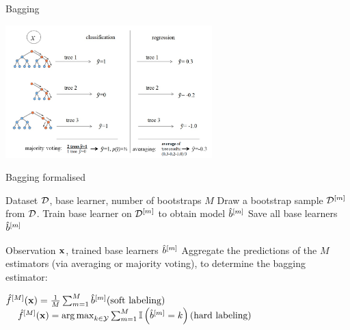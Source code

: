 \documentclass[11pt,compress,t,notes=noshow, xcolor=table]{beamer}
\begin{document}
\begin{vbframe}{Bagging}
\begin{center}
\includegraphics[width=0.6\textwidth]{figure_man/rf_majvot_averaging.png}
\end{center}
\end{vbframe}


\begin{vbframe}{Bagging formalised}

\begin{algorithm}[H]
  \footnotesize
  \caption*{Bagging algorithm: Training}
  \begin{algorithmic}[1]
     Dataset $\mathcal{D}$, base learner, number of bootstraps $M$
      \State Draw a bootstrap sample $\mathcal{D}^{[m]}$ from $\mathcal{D}$.
      \State Train base learner on $\mathcal{D}^{[m]}$ to obtain model $\hat{b}^{[m]}$
    \EndFor
    \State Save all base learners $\hat{b}^{[m]}$
  \end{algorithmic}
\end{algorithm}

\begin{algorithm}[H]
  \footnotesize
  \caption*{Bagging algorithm: Inference}
  \begin{algorithmic}[1]
     Observation $\mathbf{x}$, trained base learners $\hat{b}^{[m]}$
    \State Aggregate the predictions of the $M$ estimators (via averaging or majority voting), to determine the bagging estimator:
    \begin{center}
    $\hat f^{[M]}(\mathbf{x}) = \frac{1}{M} \sum_{m=1}^M \hat{b}^{[m]} \text{(soft labeling)}$
    $\quad \hat f^{[M]}(\mathbf{x}) = \operatorname*{arg\,max}_{k \in \mathcal{Y}} \sum_{m=1}^M \mathbb{I}\left(\hat{b}^{[m]} = k\right) \text{(hard labeling)}$
    \end{center}
  \end{algorithmic}
\end{algorithm}

\end{vbframe}
\end{document}
